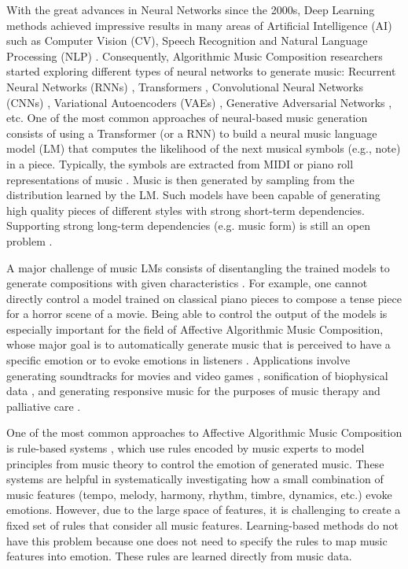 With the great advances in Neural Networks since the 2000s, Deep Learning methods achieved impressive results in many areas of Artificial Intelligence (AI) such as Computer Vision (CV), Speech Recognition and Natural Language Processing (NLP) \cite{goodfellow2016deep}. Consequently, Algorithmic Music Composition researchers started exploring different types of neural networks to generate music: Recurrent Neural Networks (RNNs) \cite{oore2017learning}, Transformers \cite{huang2018music}, Convolutional Neural Networks (CNNs) \cite{huang2019counterpoint}, Variational Autoencoders (VAEs) \cite{roberts2018hierarchical}, Generative Adversarial Networks \cite{dong2018musegan}, etc. One of the most common approaches of neural-based music generation consists of using a Transformer (or a RNN) to build a neural music language model (LM) that computes the likelihood of the next musical symbols (e.g., note) in a piece. Typically, the symbols are extracted from MIDI or piano roll representations of music \cite{briot2017deep}. Music is then generated by sampling from the distribution learned by the LM. Such models have been capable of generating high quality pieces of different styles with strong short-term dependencies. Supporting strong long-term dependencies (e.g. music form) is still an open problem \cite{briot2017deep}.

A major challenge of music LMs consists of disentangling the trained models to generate compositions with given characteristics \cite{ferreira_2019}. For example, one cannot directly control a model trained on classical piano pieces to compose a tense piece for a horror scene of a movie. Being able to control the output of the models is especially important for the field of Affective Algorithmic Music Composition, whose major goal is to automatically generate music that is perceived to have a specific emotion or to evoke emotions in listeners \cite{williams2015investigating}. Applications involve generating soundtracks for movies and video games \cite{williams2015dynamic}, sonification of biophysical data \cite{Chen2015}, and generating responsive music for the purposes of music therapy and palliative care \cite{miranda2011brain}.

One of the most common approaches to Affective Algorithmic Music Composition is rule-based systems \cite{williams2015investigating}, which use rules encoded by music experts to model principles
from music theory to control the emotion of generated music. These systems are helpful in systematically investigating how a small combination of music features (tempo, melody, harmony, rhythm, timbre, dynamics, etc.) evoke emotions. However, due to the large space of features, it is challenging to create a fixed set of rules that consider all music features. Learning-based methods do not have this problem because one does not need to specify the rules to map music features into emotion. These rules are learned directly from music data.


